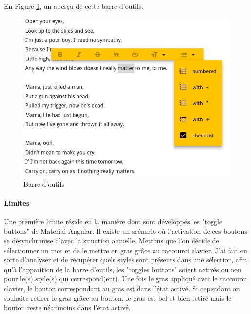 \documentclass[12pt]{article}
\begin{document}
\paragraph{}
En Figure \ref{fig:gallery5}, un aperçu de cette barre d'outils. %
\begin{figure}[H]
    \centering
    \includegraphics[scale=0.85]{gallery/toolbar.jpg}
    \caption[nom dans le sommaire]{Barre d'outils}
    \label{fig:gallery5}
\end{figure}

\paragraph{Limites}
Une première limite réside en la manière dont sont développés les "toggle buttons" de Material Angular. Il existe un scénario où l'activation de ces boutons se désynchronise d'avec la situation actuelle. Mettons que l'on décide de sélectionner un mot et de le mettre en gras grâce au raccourci clavier. J'ai fait en sorte d'analyser et de récupérer quels styles sont présents dans une sélection, afin qu'à l'apparition de la barre d'outils, les "toggles buttons" soient activés ou non pour le(s) style(s) qui correspond(ent). Une fois le gras appliqué avec le raccourci clavier, le bouton correspondant au gras est dans l'état activé. Si cependant on souhaite retirer le gras grâce au bouton, le gras est bel et bien retiré mais le bouton reste néanmoins dans l'état activé.
\end{document}

